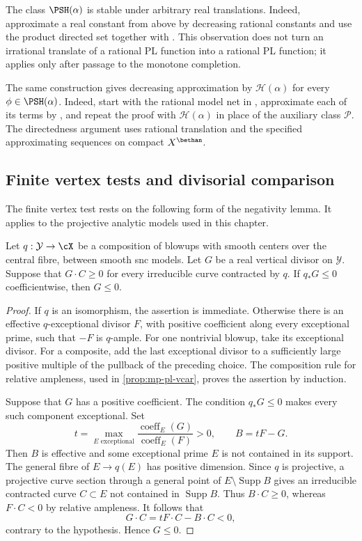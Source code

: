 The class $\PSH(\alpha)$ is stable under arbitrary real translations.
Indeed, approximate a real constant from above by decreasing rational
constants and use the product directed set together with
.  This observation does not turn an
irrational translate of a rational PL function into a rational PL function;
it applies only after passage to the monotone completion.

The same construction gives decreasing approximation by
$\mathcal H(\alpha)$ for every $\phi\in\PSH(\alpha)$.
Indeed, start with the rational model net in
, approximate each of its terms by
, and repeat the proof with
$\mathcal H(\alpha)$ in place of the auxiliary class $\mathcal P$.
The directedness argument uses rational translation and the specified
approximating sequences on compact $X^{\bethan}$.

\subsection{Finite vertex tests and divisorial comparison}
\label{subsec:mp-psh-divisorial-comparison}

The finite vertex test rests on the following form of the negativity lemma. It applies to the projective analytic models used in this chapter.

\begin{lemma}\label{lem:mp-vertical-negativity}
Let $q:\mathcal Y\to\cX$ be a composition of blowups with smooth centers over the central fibre, between smooth snc models. Let $G$ be a real vertical divisor on $\mathcal Y$. Suppose that $G\cdot C\geq0$ for every irreducible curve contracted by $q$. If $q_*G\leq0$ coefficientwise, then $G\leq0$.
\end{lemma}

\begin{proof}
If $q$ is an isomorphism, the assertion is immediate. Otherwise there is an effective $q$-exceptional divisor $F$, with positive coefficient along every exceptional prime, such that $-F$ is $q$-ample. For one nontrivial blowup, take its exceptional divisor. For a composite, add the last exceptional divisor to a sufficiently large positive multiple of the pullback of the preceding choice. The composition rule for relative ampleness, used in \cref{prop:mp-pl-vcar}, proves the assertion by induction.

Suppose that $G$ has a positive coefficient. The condition $q_*G\leq0$ makes every such component exceptional. Set
\[
 t=\max_{E\text{ exceptional}}
       \frac{\operatorname{coeff}_E(G)}{\operatorname{coeff}_E(F)}>0,
 \qquad B=tF-G.
\]
Then $B$ is effective and some exceptional prime $E$ is not contained in its support. The general fibre of $E\to q(E)$ has positive dimension. Since $q$ is projective, a projective curve section through a general point of $E\setminus\operatorname{Supp}B$ gives an irreducible contracted curve $C\subset E$ not contained in $\operatorname{Supp}B$. Thus $B\cdot C\geq0$, whereas $F\cdot C<0$ by relative ampleness. It follows that
\[
             G\cdot C=tF\cdot C-B\cdot C<0,
\]
contrary to the hypothesis. Hence $G\leq0$.
\end{proof}

